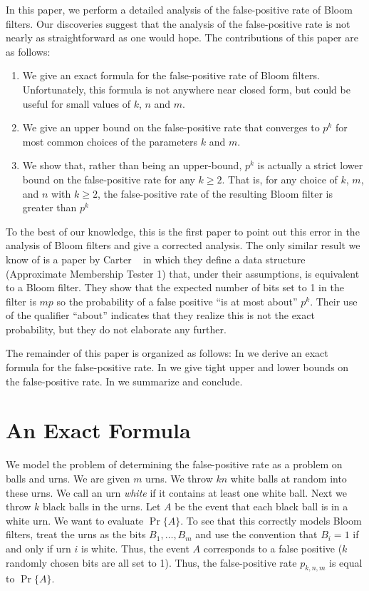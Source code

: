 \documentclass[lotsofwhite]{patmorin}
\begin{document}
In this paper, we perform a detailed analysis of the false-positive
rate of Bloom filters.  Our discoveries suggest that the analysis of
the false-positive rate is not nearly as straightforward as one would
hope. The contributions of this paper are as follows:
\begin{enumerate}

\item We give an exact formula for the false-positive rate of Bloom filters.
Unfortunately, this formula is not anywhere near closed form, but
could be useful for small values of $k$, $n$ and $m$.

\item We give an upper bound on the false-positive rate that converges to
 $p^k$ for most common choices of the parameters $k$ and $m$.

\item We show that, rather than being an upper-bound,
$p^k$ is actually a strict lower bound on the
false-positive rate for any $k\ge 2$.  That is, for any choice of $k$,
$m$, and $n$ with $k\ge 2$, the false-positive rate of the resulting
Bloom filter is greater than $p^k$
\end{enumerate}

To the best of our knowledge, this is the first paper to point out
this error in the analysis of Bloom filters and give a corrected
analysis.  The only similar result we know of is a paper
by Carter \etal\ \cite{cfgmw78} in which they define a data structure
(Approximate Membership Tester 1) that, under their assumptions, is
equivalent to a Bloom filter.  They show that the expected number of
bits set to 1 in the filter is $mp$ so the probability of
a false positive ``is at most about'' $p^k$.  Their use
of the qualifier ``about'' indicates that they realize this is not the
exact probability, but they do not elaborate any further.

The remainder of this paper is organized as follows:  In
 we derive an exact formula for the false-positive rate.  In
 we give tight upper and lower bounds on the
false-positive rate.  In  we summarize and
conclude.

\section{An Exact Formula}

We model the problem of determining the false-positive rate as a
problem on balls and urns.  We are given $m$ urns. We throw $kn$
white balls at random into these urns.  We call an urn \emph{white}
if it contains at least one white ball.  Next we throw $k$ black balls
in the urns.  Let $A$ be the event that each black ball is in a white
urn.  We want to evaluate $\Pr\{A\}$.  To see that this correctly
models Bloom filters, treat the urns as the bits $B_1,\ldots,B_m$ and
use the convention that $B_i=1$ if and only if urn $i$ is white.
Thus, the event $A$ corresponds to a false positive ($k$ randomly
chosen bits are all set to 1).  Thus, the false-positive rate
$p_{k,n,m}$ is equal to $\Pr\{A\}$.
\end{document}
